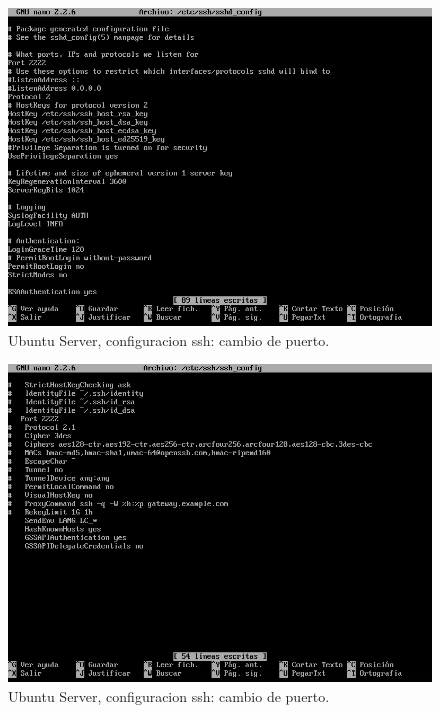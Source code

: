 \begin{figure}[H] 
	\centering
	\includegraphics[width=15cm]{./img/ejercicio7-4.png} 	
	\caption{Ubuntu Server, configuracion ssh: cambio de puerto.} \label{fig:ejercicio7-4}
\end{figure}

\begin{figure}[H] 
	\centering
	\includegraphics[width=15cm]{./img/ejercicio7-6.png} 	
	\caption{Ubuntu Server, configuracion ssh: cambio de puerto.} \label{fig:ejercicio7-6}
\end{figure}

